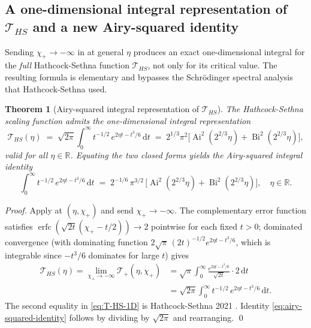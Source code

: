 \documentclass[11pt,a4paper]{article}
\theoremstyle{plain}
\newtheorem{theorem}{Theorem}[section]
\theoremstyle{definition}
\newcommand{\R}{\mathbb{R}}
\renewcommand{\d}{\mathrm{d}}
\newcommand{\Ai}{\operatorname{Ai}}
\newcommand{\Bi}{\operatorname{Bi}}
\begin{document}
\subsection{A one-dimensional integral representation of $\mathcal T_{HS}$ and a new Airy-squared identity}

Sending $\chi_+ \to -\infty$ in  at general $\eta$ produces an exact one-dimensional integral for the \emph{full} Hathcock-Sethna function $\mathcal T_{HS}$, not only for its critical value. The resulting formula is elementary and bypasses the Schr\"odinger spectral analysis that Hathcock-Sethna used.

\begin{theorem}[Airy-squared integral representation of $\mathcal T_{HS}$]\label{thm:airy-integral}
The Hathcock-Sethna scaling function admits the one-dimensional integral representation
\begin{equation}
\boxed{\mathcal T_{HS}(\eta) \;=\; \sqrt{2\pi}\int_0^\infty t^{-1/2}\,e^{2\eta t - t^3/6}\,\d t \;=\; 2^{1/3}\pi^2\Big[\Ai^2(2^{2/3}\eta) + \Bi^2(2^{2/3}\eta)\Big],}
\label{eq:T-HS-1D}
\end{equation}
valid for all $\eta \in \R$. Equating the two closed forms yields the Airy-squared integral identity
\begin{equation}
\int_0^\infty t^{-1/2}\,e^{2\eta t - t^3/6}\,\d t \;=\; 2^{-1/6}\,\pi^{3/2}\,\Big[\Ai^2(2^{2/3}\eta) + \Bi^2(2^{2/3}\eta)\Big],\quad \eta \in \R.
\label{eq:airy-squared-identity}
\end{equation}
\end{theorem}

\begin{proof}
Apply  at $(\eta, \chi_+)$ and send $\chi_+ \to -\infty$. The complementary error function satisfies $\operatorname{erfc}(\sqrt{2t}(\chi_+ - t/2)) \to 2$ pointwise for each fixed $t > 0$; dominated convergence (with dominating function $2\sqrt\pi\,(2t)^{-1/2}e^{2\eta t - t^3/6}$, which is integrable since $-t^3/6$ dominates for large $t$) gives
\begin{align*}
\mathcal T_{HS}(\eta) = \lim_{\chi_+ \to -\infty}\mathcal T_+(\eta,\chi_+) &= \sqrt\pi\int_0^\infty \frac{e^{2\eta t - t^3/6}}{\sqrt{2t}}\cdot 2\,\d t\\
&= \sqrt{2\pi}\int_0^\infty t^{-1/2}\,e^{2\eta t - t^3/6}\,\d t.
\end{align*}
The second equality in \eqref{eq:T-HS-1D} is Hathcock-Sethna 2021 \cite[Eq.~15]{HathcockSethna2021}. Identity \eqref{eq:airy-squared-identity} follows by dividing by $\sqrt{2\pi}$ and rearranging.
\qed
\end{proof}
\end{document}
